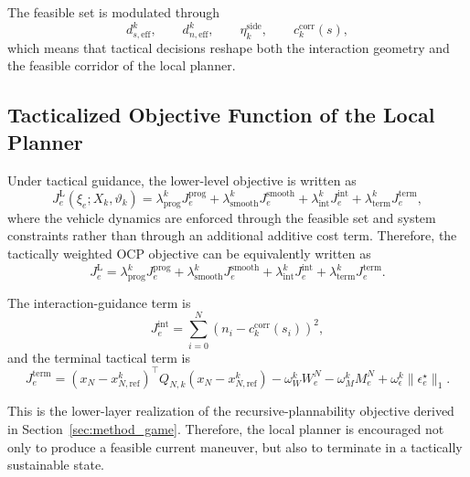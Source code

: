 \documentclass[final ,3p, times]{elsarticle}
\begin{document}
The feasible set is modulated through
\begin{equation}
d_{s,\mathrm{eff}}^k,\qquad
d_{n,\mathrm{eff}}^k,\qquad
\eta_k^{\mathrm{side}},\qquad
c_k^{\mathrm{corr}}(s),
\label{eq:feasible_set_modulators}
\end{equation}
which means that tactical decisions reshape both the interaction geometry and the feasible corridor of the local planner.

\subsection{Tacticalized Objective Function of the Local Planner}
\label{subsec:tacticalized_objective}

Under tactical guidance, the lower-level objective is written as
\begin{equation}
J_e^{\mathrm{L}}(\xi_e;X_k,\vartheta_k)
=
\lambda_{\mathrm{prog}}^k J_e^{\mathrm{prog}}
+
\lambda_{\mathrm{smooth}}^k J_e^{\mathrm{smooth}}
+
\lambda_{\mathrm{int}}^k J_e^{\mathrm{int}}
+
\lambda_{\mathrm{term}}^k J_e^{\mathrm{term}},
\label{eq:local_objective_decomposition}
\end{equation}
where the vehicle dynamics are enforced through the feasible set and system constraints rather than through an additional additive cost term. Therefore, the tactically weighted OCP objective can be equivalently written as
\begin{equation}
J_e^{\mathrm{L}}
=
\lambda_{\mathrm{prog}}^k J_e^{\mathrm{prog}}
+
\lambda_{\mathrm{smooth}}^k J_e^{\mathrm{smooth}}
+
\lambda_{\mathrm{int}}^k J_e^{\mathrm{int}}
+
\lambda_{\mathrm{term}}^k J_e^{\mathrm{term}}.
\label{eq:tactical_ocp_objective_final}
\end{equation}

The interaction-guidance term is
\begin{equation}
J_e^{\mathrm{int}}
=
\sum_{i=0}^{N}
\left(
n_i-c_k^{\mathrm{corr}}(s_i)
\right)^2,
\label{eq:interaction_guided_cost}
\end{equation}
and the terminal tactical term is
\begin{equation}
J_e^{\mathrm{term}}
=
\left(
x_N-x_{N,\mathrm{ref}}^k
\right)^\top
Q_{N,k}
\left(
x_N-x_{N,\mathrm{ref}}^k
\right)
-
\omega_W^k W_e^N
-
\omega_M^k M_e^N
+
\omega_\epsilon^k \|\epsilon_e^\star\|_1.
\label{eq:terminal_cost_final}
\end{equation}

This is the lower-layer realization of the recursive-plannability objective derived in Section~\ref{sec:method_game}. Therefore, the local planner is encouraged not only to produce a feasible current maneuver, but also to terminate in a tactically sustainable state.
\end{document}
